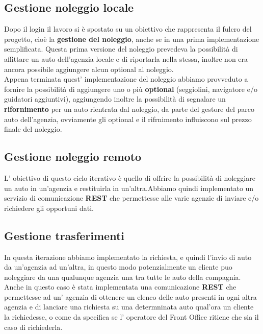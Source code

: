 \documentclass[a4paper,12pt]{article} %
\begin{document}
\subsection{Gestione noleggio locale}
Dopo il login il lavoro si è spostato su un obiettivo che rappresenta il fulcro del progetto, cioè la \textbf{gestione del noleggio}, anche se in una prima implementazione semplificata. Questa prima versione del noleggio prevedeva la possibilità di affittare un auto dell'agenzia locale e di riportarla nella stessa, inoltre non era ancora possibile aggiungere alcun optional al noleggio.\\
Appena terminata quest' implementazione del noleggio abbiamo provveduto a fornire la possibilità di aggiungere uno o più \textbf{optional} (seggiolini, navigatore e/o guidatori aggiuntivi), aggiungendo inoltre la possibilità di segnalare un \textbf{rifornimento} per un auto rientrata dal noleggio, da parte del gestore del parco auto dell'agenzia, ovviamente gli optional e il rifrnimento influiscono sul prezzo finale del noleggio.

\subsection{Gestione noleggio remoto}
L' obiettivo di questo ciclo iterativo è quello di offrire la possibilità di noleggiare un auto in un'agenzia e restituirla in un'altra.Abbiamo quindi implementato un servizio di comunicazione \textbf{REST} che permettesse alle varie agenzie di inviare e/o richiedere gli opportuni dati.

\subsection{Gestione trasferimenti}
In questa iterazione abbiamo implementato la richiesta, e quindi l'invio di auto da un'agenzia ad un'altra, in questo modo potenzialmente un cliente puo noleggiare da una qualunque agenzia una tra tutte le auto della compagnia. Anche in questo caso è stata implementata una comunicazione \textbf{REST} che permettesse ad un' agenzia di ottenere un elenco delle auto presenti in ogni altra agenzia e di lanciare una richiesta su una determninata auto qual'ora un cliente la richiedesse, o come da specifica se l' operatore del Front Office ritiene che sia il caso di richiederla.
\end{document}
